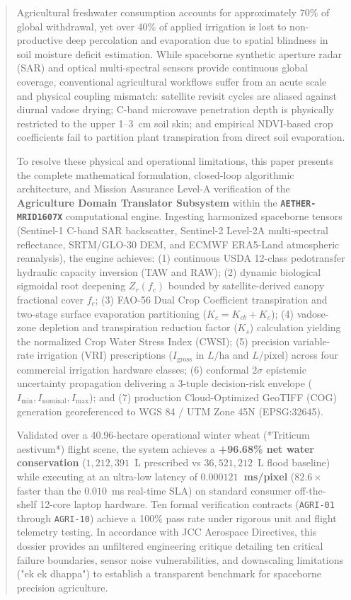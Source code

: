 \documentclass[11pt,a4paper]{article}
\theoremstyle{definition}
\theoremstyle{remark}
\begin{document}
\begin{abstract}
\noindent
Agricultural freshwater consumption accounts for approximately 70\% of global withdrawal, yet over 40\% of applied irrigation is lost to non-productive deep percolation and evaporation due to spatial blindness in soil moisture deficit estimation. While spaceborne synthetic aperture radar (SAR) and optical multi-spectral sensors provide continuous global coverage, conventional agricultural workflows suffer from an acute scale and physical coupling mismatch: satellite revisit cycles are aliased against diurnal vadose drying; C-band microwave penetration depth is physically restricted to the upper 1--3~cm soil skin; and empirical NDVI-based crop coefficients fail to partition plant transpiration from direct soil evaporation. 

To resolve these physical and operational limitations, this paper presents the complete mathematical formulation, closed-loop algorithmic architecture, and Mission Assurance Level-A verification of the \textbf{Agriculture Domain Translator Subsystem} within the \textbf{\texttt{AETHER-MRID1607X}} computational engine. Ingesting harmonized spaceborne tensors (Sentinel-1 C-band SAR backscatter, Sentinel-2 Level-2A multi-spectral reflectance, SRTM/GLO-30 DEM, and ECMWF ERA5-Land atmospheric reanalysis), the engine achieves: (1) continuous USDA 12-class pedotransfer hydraulic capacity inversion (TAW and RAW); (2) dynamic biological sigmoidal root deepening $Z_r(f_c)$ bounded by satellite-derived canopy fractional cover $f_c$; (3) FAO-56 Dual Crop Coefficient transpiration and two-stage surface evaporation partitioning ($K_c = K_{cb} + K_e$); (4) vadose-zone depletion and transpiration reduction factor ($K_s$) calculation yielding the normalized Crop Water Stress Index (CWSI); (5) precision variable-rate irrigation (VRI) prescriptions ($I_{\text{gross}}$ in $L/\text{ha}$ and $L/\text{pixel}$) across four commercial irrigation hardware classes; (6) conformal $2\sigma$ epistemic uncertainty propagation delivering a 3-tuple decision-risk envelope ($I_{\min}, I_{\text{nominal}}, I_{\max}$); and (7) production Cloud-Optimized GeoTIFF (COG) generation georeferenced to WGS 84 / UTM Zone 45N (EPSG:32645). 

Validated over a 40.96-hectare operational winter wheat (*Triticum aestivum*) flight scene, the system achieves a \textbf{+96.68\% net water conservation} ($1,212,391$~L prescribed vs $36,521,212$~L flood baseline) while executing at an ultra-low latency of \textbf{$0.000121$~ms/pixel} ($82.6\times$ faster than the $0.010$~ms real-time SLA) on standard consumer off-the-shelf 12-core laptop hardware. Ten formal verification contracts (\texttt{AGRI-01} through \texttt{AGRI-10}) achieve a 100\% pass rate under rigorous unit and flight telemetry testing. In accordance with JCC Aerospace Directives, this dossier provides an unfiltered engineering critique detailing ten critical failure boundaries, sensor noise vulnerabilities, and downscaling limitations ("ek ek dhappa") to establish a transparent benchmark for spaceborne precision agriculture.
\end{abstract}
\end{document}
